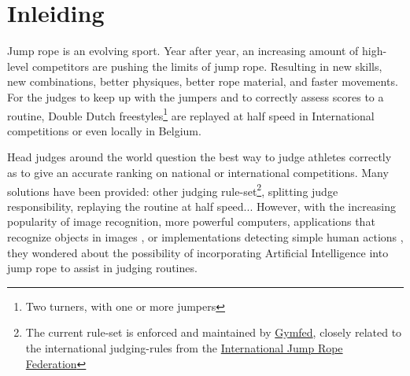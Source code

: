 
\section{Inleiding}
\label{sec:inleiding}

    

Jump rope is an evolving sport.
Year after year, an increasing amount of high-level competitors are pushing the limits of jump rope.
Resulting in new skills, new combinations, better physiques, better rope material, and faster movements. For the judges to keep up with the jumpers and to correctly assess scores to a routine, Double Dutch freestyles\footnote{Two turners, with one or more jumpers} are replayed at half speed in International competitions or even locally in Belgium.

Head judges around the world question the best way to judge athletes correctly as to give an accurate ranking on national or international competitions.
Many solutions have been provided: other judging rule-set\footnote{The current rule-set is enforced and maintained by \href{https://www.gymfed.be/}{Gymfed}, closely related to the international judging-rules from the \href{https://ijru.sport/}{International Jump Rope Federation}}, splitting judge responsibility, replaying the routine at half speed...
However, with the increasing popularity of image recognition, more powerful computers, applications that recognize objects in images \autocite{Singh_Gill_2022}, or implementations detecting simple human actions \autocite{LUQMAN_2022}, they wondered about the possibility of incorporating Artificial Intelligence into jump rope to assist in judging routines.

